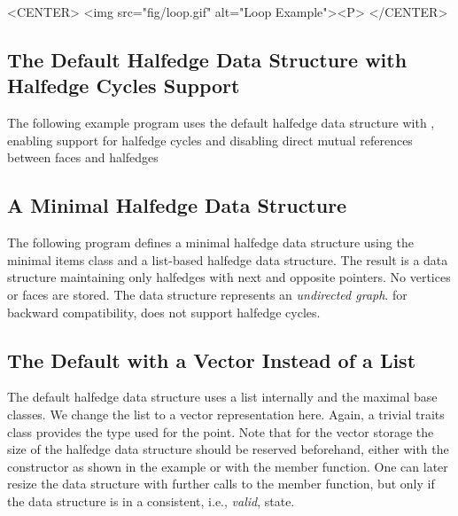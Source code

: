 \begin{ccHtmlOnly}
    <CENTER>
      <img src="fig/loop.gif" alt="Loop Example"><P>
    </CENTER>
\end{ccHtmlOnly}



\subsection{The Default Halfedge Data Structure with Halfedge Cycles Support}

{\XHDS
The following example program uses the default halfedge data structure
with , enabling support for
halfedge cycles and disabling direct mutual references between faces and halfedges
}


\subsection{A Minimal Halfedge Data Structure}

The following program defines a minimal halfedge data structure using
the minimal items class  and a
list-based halfedge data structure. The result is a data structure
maintaining only halfedges with next and opposite pointers.  No
vertices or faces are stored. The data structure represents an {\em
  undirected graph}.
{\XHDS for backward compatibility, 
 does not support halfedge cycles.}


\subsection{The Default with a Vector Instead of a List}

The default halfedge data structure uses a list internally and the
maximal base classes. We change the list to a vector representation
here. Again, a trivial traits class provides the type used for the
point.  Note that for the vector storage the size of the halfedge data
structure should be reserved beforehand, either with the constructor
as shown in the example or with the  member function.
One can later resize the data structure with further calls to the
 member function, but only if the data structure is 
in a consistent, i.e., {\em valid}, state.

